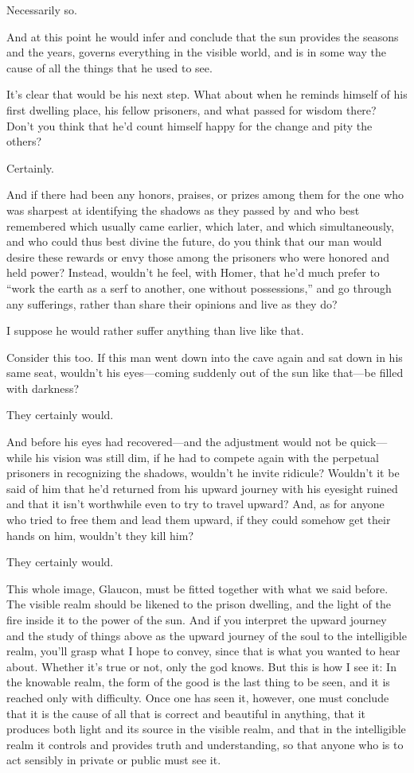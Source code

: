 			Necessarily so. 

			And at this point he would infer and conclude that the sun provides the seasons and the years, governs everything in the visible world, and is in some way the cause of all the things that he used to see. 

			It's clear that would be his next step. What about when he reminds himself of his first dwelling place, his fellow prisoners, and what passed for wisdom there? Don't you think that he'd count himself happy for the change and pity the others? 

			Certainly. 

			And if there had been any honors, praises, or prizes among them for the one who was sharpest at identifying the shadows as they passed by and who best remembered which usually came earlier, which later, and which simultaneously, and who could thus best divine the future, do you think that our man would desire these rewards or envy those among the prisoners who were honored and held power? Instead, wouldn't he feel, with Homer, that he'd much prefer to ``work the earth as a serf to another, one without possessions,'' and go through any sufferings, rather than share their opinions and live as they do? 

			I suppose he would rather suffer anything than live like that. 

			Consider this too. If this man went down into the cave again and sat down in his same seat, wouldn't his eyes---coming suddenly out of the sun like that---be filled with darkness? 

			They certainly would. 

			And before his eyes had recovered---and the adjustment would not be quick---while his vision was still dim, if he had to compete again with the perpetual prisoners in recognizing the shadows, wouldn't he invite ridicule? Wouldn't it be said of him that he'd returned from his upward journey with his eyesight ruined and that it isn't worthwhile even to try to travel upward? And, as for anyone who tried to free them and lead them upward, if they could somehow get their hands on him, wouldn't they kill him? 

			They certainly would. 

			This whole image, Glaucon, must be fitted together with what we said before. The visible realm should be likened to the prison dwelling, and the light of the fire inside it to the power of the sun. And if you interpret the upward journey and the study of things above as the upward journey of the soul to the intelligible realm, you'll grasp what I hope to convey, since that is what you wanted to hear about. Whether it's true or not, only the god knows. But this is how I see it: In the knowable realm, the form of the good is the last thing to be seen, and it is reached only with difficulty. Once one has seen it, however, one must conclude that it is the cause of all that is correct and beautiful in anything, that it produces both light and its source in the visible realm, and that in the intelligible realm it controls and provides truth and understanding, so that anyone who is to act sensibly in private or public must see it. 

